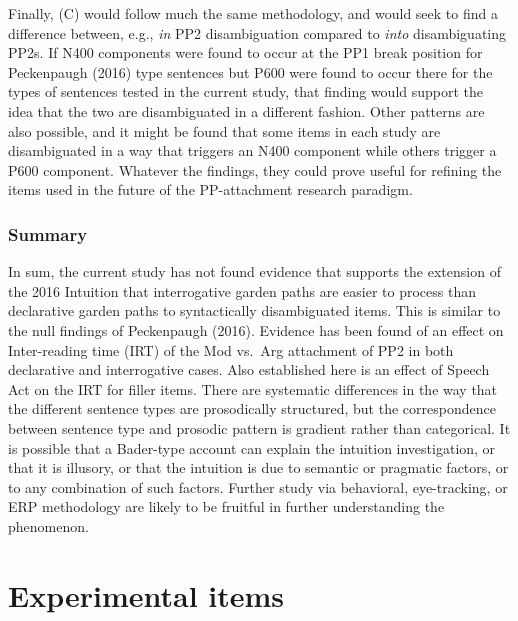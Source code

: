 \documentclass[11pt,oneside]{book}
\begin{document}
Finally, (C) would follow much the same methodology, and would seek to find a difference between, e.g., \emph{in} PP2 disambiguation compared to \emph{into} disambiguating PP2s. If N400 components were found to occur at the PP1 break position for Peckenpaugh (2016) type sentences but P600 were found to occur there for the types of sentences tested in the current study, that finding would support the idea that the two are disambiguated in a different fashion. Other patterns are also possible, and it might be found that some items in each study are disambiguated in a way that triggers an N400 component while others trigger a P600 component. Whatever the findings, they could prove useful for refining the items used in the future of the PP-attachment research paradigm.

\hypertarget{summary-1}{%
\subsection{Summary}\label{summary-1}}

In sum, the current study has not found evidence that supports the extension of the 2016 Intuition that interrogative garden paths are easier to process than declarative garden paths to syntactically disambiguated items. This is similar to the null findings of Peckenpaugh (2016). Evidence has been found of an effect on Inter-reading time (IRT) of the Mod vs.~Arg attachment of PP2 in both declarative and interrogative cases. Also established here is an effect of Speech Act on the IRT for filler items. There are systematic differences in the way that the different sentence types are prosodically structured, but the correspondence between sentence type and prosodic pattern is gradient rather than categorical. It is possible that a Bader-type account can explain the intuition investigation, or that it is illusory, or that the intuition is due to semantic or pragmatic factors, or to any combination of such factors. Further study via behavioral, eye-tracking, or ERP methodology are likely to be fruitful in further understanding the phenomenon.

\singlespacing

\newpage

\hypertarget{appendix-appendices}{%
\appendix}


\hypertarget{appExp}{%
\chapter{Experimental items}\label{appExp}}
\end{document}
